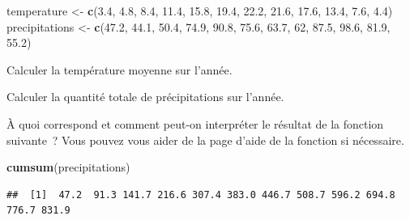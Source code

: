 \documentclass[12pt,]{book}
\newenvironment{Shaded}{\begin{snugshade}}{\end{snugshade}}
\newcommand{\DecValTok}[1]{\textcolor[rgb]{0.06,0.06,0.06}{#1}}
\newcommand{\FloatTok}[1]{\textcolor[rgb]{0.06,0.06,0.06}{#1}}
\newcommand{\KeywordTok}[1]{\textcolor[rgb]{0.27,0.27,0.27}{\textbf{#1}}}
\newcommand{\NormalTok}[1]{#1}
\newcommand{\StringTok}[1]{\textcolor[rgb]{0.5,0.5,0.5}{#1}}
\begin{document}
\begin{Shaded}
\begin{Highlighting}[]
\NormalTok{temperature <-}\StringTok{ }\KeywordTok{c}\NormalTok{(}\FloatTok{3.4}\NormalTok{, }\FloatTok{4.8}\NormalTok{, }\FloatTok{8.4}\NormalTok{, }\FloatTok{11.4}\NormalTok{, }\FloatTok{15.8}\NormalTok{, }\FloatTok{19.4}\NormalTok{, }\FloatTok{22.2}\NormalTok{, }\FloatTok{21.6}\NormalTok{, }\FloatTok{17.6}\NormalTok{, }\FloatTok{13.4}\NormalTok{, }\FloatTok{7.6}\NormalTok{, }\FloatTok{4.4}\NormalTok{)}
\NormalTok{precipitations <-}\StringTok{ }\KeywordTok{c}\NormalTok{(}\FloatTok{47.2}\NormalTok{, }\FloatTok{44.1}\NormalTok{, }\FloatTok{50.4}\NormalTok{, }\FloatTok{74.9}\NormalTok{, }\FloatTok{90.8}\NormalTok{, }\FloatTok{75.6}\NormalTok{, }\FloatTok{63.7}\NormalTok{, }\DecValTok{62}\NormalTok{, }\FloatTok{87.5}\NormalTok{, }\FloatTok{98.6}\NormalTok{, }\FloatTok{81.9}\NormalTok{, }\FloatTok{55.2}\NormalTok{)}
\end{Highlighting}
\end{Shaded}

Calculer la température moyenne sur l'année.

Calculer la quantité totale de précipitations sur l'année.

À quoi correspond et comment peut-on interpréter le résultat de la fonction suivante~? Vous pouvez vous aider de la page d'aide de la fonction si nécessaire.

\begin{Shaded}
\begin{Highlighting}[]
\KeywordTok{cumsum}\NormalTok{(precipitations)}
\end{Highlighting}
\end{Shaded}

\begin{verbatim}
##  [1]  47.2  91.3 141.7 216.6 307.4 383.0 446.7 508.7 596.2 694.8 776.7 831.9
\end{verbatim}
\end{document}
